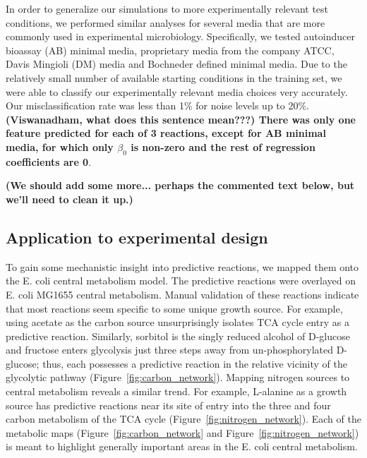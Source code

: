 \documentclass[12pt]{article}
\begin{document}
In order to generalize our simulations to more experimentally relevant test conditions, we performed similar analyses for several media that are more commonly used in experimental microbiology. Specifically, we tested autoinducer bioassay (AB) minimal media, proprietary media from the company ATCC, Davis Mingioli (DM) media and Bochneder defined minimal media. Due to the relatively small number of available starting conditions in the training set, we were able to classify our experimentally relevant media choices very accurately. Our misclassification rate was less than 1\% for noise levels up to 20\%. \textbf{(Viswanadham, what does this sentence mean???) There was only one feature predicted for each of 3 reactions, except for AB minimal media, for which only $\beta_0$ is non-zero and the rest of regression coefficients are 0}. 

\textbf{(We should add some more... perhaps the commented text below, but we'll need to clean it up.)}


\subsection*{Application to experimental design}

To gain some mechanistic insight into predictive reactions, we mapped them onto the E. coli central metabolism model. The predictive reactions were overlayed on E. coli MG1655 central metabolism. Manual validation of these reactions indicate that most reactions seem specific to some unique growth source. For example, using acetate as the carbon source unsurprisingly isolates TCA cycle entry as a predictive reaction. Similarly, sorbitol is the singly reduced alcohol of D-glucose and fructose enters glycolysis just three steps away from un-phosphorylated D-glucose; thus, each possesses a predictive reaction in the relative vicinity of the glycolytic pathway (Figure~\ref{fig:carbon_network}). Mapping nitrogen sources to central metabolism reveals a similar trend. For example, L-alanine as a growth source has predictive reactions near its site of entry into the three and four carbon metabolism of the TCA cycle (Figure~\ref{fig:nitrogen_network}). Each of the metabolic maps (Figure~\ref{fig:carbon_network} and Figure~\ref{fig:nitrogen_network}) is meant to highlight generally important areas in the E. coli central metabolism.
\end{document}
